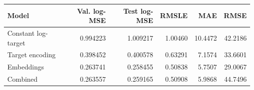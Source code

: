 \begin{center}\small
\begin{tabular}{lrrrrr}
\toprule
Model & Val. log-MSE & Test log-MSE & RMSLE & MAE & RMSE \\
\midrule
Constant log-target & 0.994223 & 1.009217 & 1.00460 & 10.4472 & 42.2186 \\
Target encoding & 0.398452 & 0.400578 & 0.63291 & 7.1574 & 33.6601 \\
Embeddings & 0.263741 & 0.258455 & 0.50838 & 5.7507 & 29.0067 \\
Combined & 0.263557 & 0.259165 & 0.50908 & 5.9868 & 44.7496 \\
\bottomrule
\end{tabular}\end{center}
